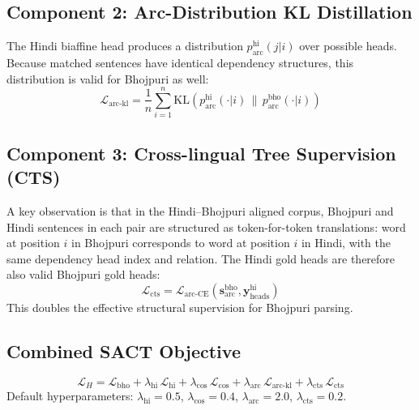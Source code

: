 \documentclass[12pt,a4paper,oneside]{report}
\newcommand{\bho}{Bhojpuri}
\newcommand{\hi}{Hindi}
\begin{document}
\subsection{Component 2: Arc-Distribution KL Distillation}
\label{sec:kl_dist}

The Hindi biaffine head produces a distribution $p^{\text{hi}}_{\text{arc}}(j | i)$
over possible heads. Because matched sentences have identical dependency structures,
this distribution is valid for \bho{} as well:
\begin{equation}
  \mathcal{L}_{\text{arc-kl}} = \frac{1}{n}\sum_{i=1}^{n}
    \text{KL}\!\left(p^{\text{hi}}_{\text{arc}}(\cdot|i) \,\|\, p^{\text{bho}}_{\text{arc}}(\cdot|i)\right)
  \label{eq:kl_arc}
\end{equation}

\subsection{Component 3: Cross-lingual Tree Supervision (CTS)}
\label{sec:cts}

A key observation is that in the Hindi--Bhojpuri aligned corpus, \bho{} and \hi{}
sentences in each pair are structured as token-for-token translations: word at
position $i$ in Bhojpuri corresponds to word at position $i$ in Hindi, with the same
dependency head index and relation. The Hindi gold heads are therefore also valid
Bhojpuri gold heads:
\begin{equation}
  \mathcal{L}_{\text{cts}} = \mathcal{L}_{\text{arc-CE}}(\mathbf{s}^{\text{bho}}_{\text{arc}}, \mathbf{y}^{\text{hi}}_{\text{heads}})
  \label{eq:cts}
\end{equation}
This doubles the effective structural supervision for Bhojpuri parsing.

\subsection{Combined SACT Objective}

\begin{equation}
  \mathcal{L}_H = \mathcal{L}_{\text{bho}}
    + \lambda_{\text{hi}}\,\mathcal{L}_{\text{hi}}
    + \lambda_{\text{cos}}\,\mathcal{L}_{\text{cos}}
    + \lambda_{\text{arc}}\,\mathcal{L}_{\text{arc-kl}}
    + \lambda_{\text{cts}}\,\mathcal{L}_{\text{cts}}
  \label{eq:loss_h}
\end{equation}
Default hyperparameters: $\lambda_{\text{hi}}=0.5$,
$\lambda_{\text{cos}}=0.4$, $\lambda_{\text{arc}}=2.0$,
$\lambda_{\text{cts}}=0.2$.
\end{document}
